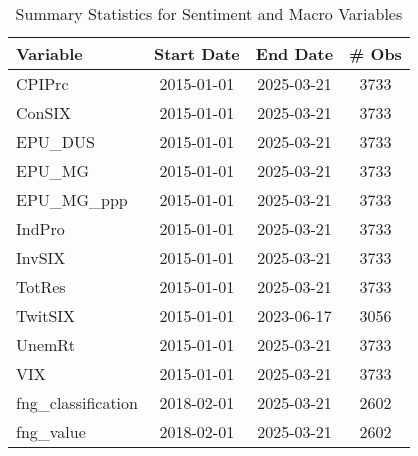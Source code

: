 \begin{table}[ht]
\centering
\scriptsize
\setlength{\tabcolsep}{4pt}
\begin{tabular}{lccc}
\toprule
Variable & Start Date & End Date & \# Obs \\
\midrule
CPIPrc & 2015-01-01 & 2025-03-21 & 3733 \\
ConSIX & 2015-01-01 & 2025-03-21 & 3733 \\
EPU_DUS & 2015-01-01 & 2025-03-21 & 3733 \\
EPU_MG & 2015-01-01 & 2025-03-21 & 3733 \\
EPU_MG_ppp & 2015-01-01 & 2025-03-21 & 3733 \\
IndPro & 2015-01-01 & 2025-03-21 & 3733 \\
InvSIX & 2015-01-01 & 2025-03-21 & 3733 \\
TotRes & 2015-01-01 & 2025-03-21 & 3733 \\
TwitSIX & 2015-01-01 & 2023-06-17 & 3056 \\
UnemRt & 2015-01-01 & 2025-03-21 & 3733 \\
VIX & 2015-01-01 & 2025-03-21 & 3733 \\
fng_classification & 2018-02-01 & 2025-03-21 & 2602 \\
fng_value & 2018-02-01 & 2025-03-21 & 2602 \\
\bottomrule
\end{tabular}
\caption{Summary Statistics for Sentiment and Macro Variables}
\label{tab:macro_variable_summary}
\end{table}
